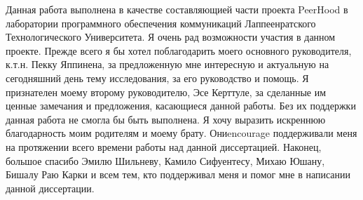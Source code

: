 Данная работа выполнена в качестве составляющией части проекта PeerHood в лаборатории программного 
обеспечения коммуникаций Лаппеенратского Технологического Университета. Я очень рад возможности 
участия в данном проекте.
Прежде всего я бы хотел поблагодарить моего основного руководителя, к.т.н. Пекку Яппинена, 
за предложенную мне интересную и актуальную на сегодняшний день тему исследования, за его 
руководство и помощь.
Я признателен моему второму руководителю, Эсе Керттуле, за сделанные им ценные замечания и 
предложения, касающиеся данной работы. Без их поддержки данная работа не смогла бы быть выполнена.
Я хочу выразить искреннюю благодарность моим родителям и моему брату. Ониencourage поддерживали 
меня на протяжении всего времени работы над данной диссертацией.
Наконец, большое спасибо Эмилю Шильневу, Камило Сифуентесу, Михаю Юшану, Бишалу Раю Карки и всем 
тем, кто поддерживал меня и помог мне в написании данной диссертации.